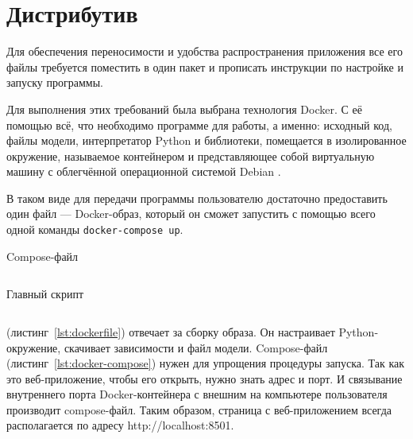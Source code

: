 \section{Дистрибутив}

Для обеспечения переносимости и удобства распространения приложения все его файлы требуется поместить в один пакет и прописать инструкции по настройке и запуску программы.

Для выполнения этих требований была выбрана технология Docker. С её помощью всё, что необходимо программе для работы, а именно: исходный код, файлы модели, интерпретатор Python и библиотеки, помещается в изолированное окружение, называемое контейнером и представляющее собой виртуальную машину с облегчённой операционной системой Debian \cite{doc:docker}.

В таком виде для передачи программы пользователю достаточно предоставить один файл --- Docker-образ, который он сможет запустить с помощью всего одной команды \verb|docker-compose up|.

\begin{listing}[h]
    \caption{Compose-файл}
    \inputminted{text}{../inc/code/docker-compose.yml}
    \label{lst:docker-compose}
\end{listing}

\begin{listing}[h]
    \caption{Главный скрипт }
    \inputminted{text}{../inc/code/Dockerfile.txt}
    \label{lst:dockerfile}
\end{listing}

 (листинг \ref*{lst:dockerfile}) отвечает за сборку образа. Он настраивает Python-окружение, скачивает зависимости и файл модели. Compose-файл (листинг \ref*{lst:docker-compose}) нужен для упрощения процедуры запуска. Так как это веб-приложение, чтобы его открыть, нужно знать адрес и порт. И связывание внутреннего порта Docker-контейнера с внешним на компьютере пользователя производит compose-файл. Таким образом, страница с веб-приложением всегда располагается по адресу http://localhost:8501.